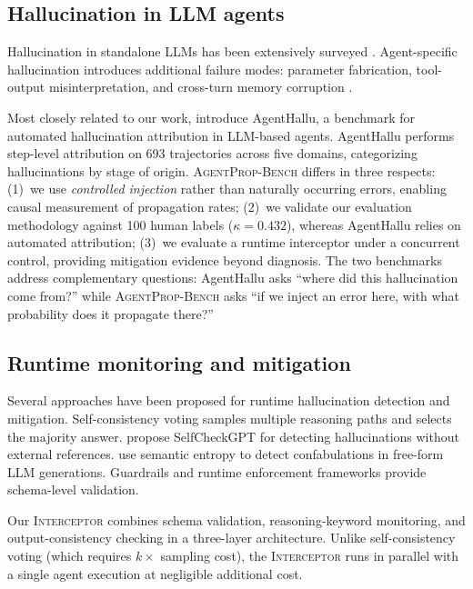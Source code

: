 \documentclass{ieeeaccess}
\newcommand{\bench}{\textsc{AgentProp-Bench}\xspace}
\newcommand{\interceptor}{\textsc{Interceptor}\xspace}
\begin{document}
\subsection{Hallucination in LLM agents}

Hallucination in standalone LLMs has been extensively surveyed
\cite{huang2024hallucination,lin2025agenthallusurvey}.
Agent-specific hallucination introduces additional failure modes:
parameter fabrication, tool-output misinterpretation, and cross-turn
memory corruption \cite{zhang2025memory}.

Most closely related to our work, \cite{liu2026agenthallu} introduce
AgentHallu, a benchmark for automated hallucination attribution in
LLM-based agents.
AgentHallu performs step-level attribution on 693 trajectories across
five domains, categorizing hallucinations by stage of origin.
\bench{} differs in three respects:
(1)~we use \emph{controlled injection} rather than naturally occurring
errors, enabling causal measurement of propagation rates;
(2)~we validate our evaluation methodology against 100 human labels
($\kappa{=}0.432$), whereas AgentHallu relies on automated attribution;
(3)~we evaluate a runtime interceptor under a concurrent control,
providing mitigation evidence beyond diagnosis.
The two benchmarks address complementary questions: AgentHallu asks
``where did this hallucination come from?'' while \bench{} asks
``if we inject an error here, with what probability does it propagate
there?''

\subsection{Runtime monitoring and mitigation}

Several approaches have been proposed for runtime hallucination
detection and mitigation.
Self-consistency voting \cite{wang2023selfconsistency} samples multiple
reasoning paths and selects the majority answer.
\cite{manakul2023selfcheckgpt} propose SelfCheckGPT for detecting
hallucinations without external references.
\cite{farquhar2024semantic} use semantic entropy to detect
confabulations in free-form LLM generations.
Guardrails and runtime enforcement frameworks
\cite{wang2026agentspec} provide schema-level validation.

Our \interceptor{} combines schema validation, reasoning-keyword
monitoring, and output-consistency checking in a three-layer architecture.
Unlike self-consistency voting (which requires $k\times$ sampling cost),
the \interceptor{} runs in parallel with a single agent execution at
negligible additional cost.
\end{document}
